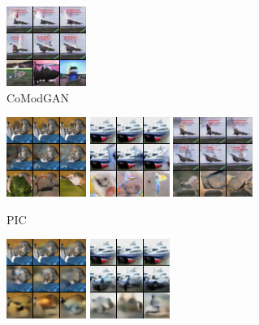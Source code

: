 \begin{figure}[t]
\begin{subfigure}[t]{0.17\textwidth}
      \includegraphics[height=\cifarimgheight]{figs/cigcvae/image-samples/cifar10/freeform_co_mod_gan_3_samples}
      \caption{CoModGAN}
    \end{subfigure}
    \begin{subfigure}[t]{0.17\textwidth}
      \centering
      \includegraphics[height=\cifarimgheight]{figs/cigcvae/image-samples/cifar10/freeform_pic_0_samples}
      \includegraphics[height=\cifarimgheight]{figs/cigcvae/image-samples/cifar10/freeform_pic_1_samples}
      \includegraphics[height=\cifarimgheight]{figs/cigcvae/image-samples/cifar10/freeform_pic_3_samples}
      \caption{PIC}
    \end{subfigure}
    \begin{subfigure}[t]{0.17\textwidth}
      \centering
      \includegraphics[height=\cifarimgheight]{figs/cigcvae/image-samples/cifar10/freeform_anp_0_samples}
      \includegraphics[height=\cifarimgheight]{figs/cigcvae/image-samples/cifar10/freeform_anp_1_samples}

\end{subfigure}
\end{figure}
